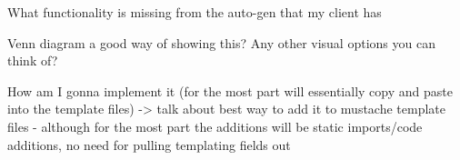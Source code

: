 What functionality is missing from the auto-gen that my client has

Venn diagram a good way of showing this? Any other visual options you can think of?

How am I gonna implement it (for the most part will essentially copy and paste into the template files) -> talk about best way to add it to mustache template files - although for the most part the additions will be static imports/code additions, no need for pulling templating fields out
